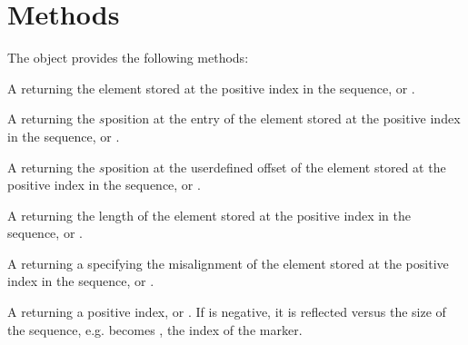 \documentclass[letterpaper,10pt,english]{sphinxmanual}
\begin{document}
\section{Methods}
\label{\detokenize{sequences:methods}}
\sphinxAtStartPar
The  object provides the following methods:
\begin{description}
\sphinxAtStartPar
A   returning the element stored at the positive index  in the sequence, or .

\sphinxAtStartPar
A   returning the \(s\)\sphinxhyphen{}position at the entry of the element stored at the positive index  in the sequence, or .

\sphinxAtStartPar
A   returning the \(s\)\sphinxhyphen{}position at the user\sphinxhyphen{}defined  offset of the element stored at the positive index 
in the sequence, or .

\sphinxAtStartPar
A   returning the length of the element stored at the positive index  in the sequence, or .

\sphinxAtStartPar
A   returning a  specifying the misalignment of the element stored at the positive index  in the sequence, or .

\sphinxAtStartPar
A   returning a positive index, or . If  is negative, it is reflected versus the size of the sequence, e.g. 
becomes , the index of the  marker.


\end{description}
\end{document}
